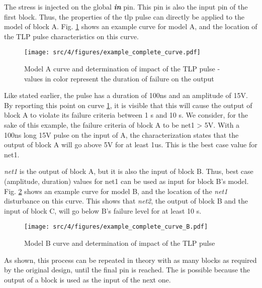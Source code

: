 The stress is injected on the global \textbf{\textit{in}} pin.
This pin is also the input pin of the first block.
Thus, the properties of the \gls{tlp} pulse can directly be applied to the model of block A.
Fig. \ref{example_complete_curve} shows an example curve for model A, and the location of the TLP pulse characteristics on this curve.


\begin{figure}[!h]
  \centering
  \texttt{[image: src/4/figures/example\_complete\_curve.pdf]}
  \caption{Model A curve and determination of impact of the TLP pulse - values in color represent the duration of failure on the output}
  \label{example_complete_curve}
\end{figure}

Like stated earlier, the pulse has a duration of 100ns and an amplitude of 15V. By reporting this point on curve \ref{example_complete_curve},
it is visible that this will cause the output of block A to violate its failure criteria between 1 \textmugreek{}s and 10 \textmugreek{}s.
We consider, for the sake of this example, the failure criteria of block A to be net1 > 5V.
With a 100ns long 15V pulse on the input of A, the characterization states that the output of block A will go above 5V for at least 1us.
This is the best case value for net1.

\textit{net1} is the output of block A, but it is also the input of block B.
Thus, best case (amplitude, duration) values for net1 can be used as input for block B's model.
Fig. \ref{example_complete_curve_B} shows an example curve for model B, and the location of the \textit{net1} disturbance on this curve.
This shows that \textit{net2}, the output of block B and the input of block C, will go below B's failure level for at least 10 \textmugreek{}s.

\begin{figure}[!h]
  \centering
  \texttt{[image: src/4/figures/example\_complete\_curve\_B.pdf]}
  \caption{Model B curve and determination of impact of the TLP pulse}
  \label{example_complete_curve_B}
\end{figure}

As shown, this process can be repeated in theory with as many blocks as required by the original design, until the final pin is reached.
The is possible because the output of a block is used as the input of the next one.



